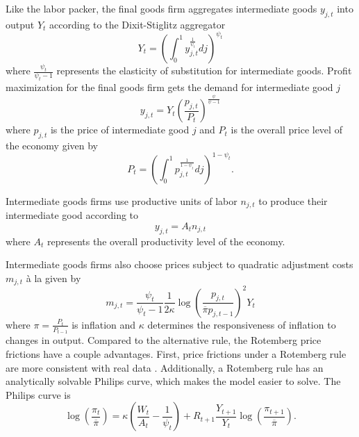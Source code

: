 Like the labor packer, the final goods firm aggregates intermediate goods $y_{j, t}$ into output $Y_t$ according to the Dixit-Stiglitz aggregator
\begin{equation*}
    Y_t = \left( \int_0^1 y_{j, t}^\frac{1}{\psi_t} dj \right)^{\psi_t}
\end{equation*}
where $\frac{\psi_t}{\psi_t - 1}$ represents the elasticity of substitution for intermediate goods. Profit maximization for the final goods firm gets the demand for intermediate good $j$
\begin{equation*}
    y_{j, t} = Y_t \left(\frac{p_{j, t}}{P_t}\right)^\frac{\psi}{\psi - 1}
\end{equation*}
where $p_{j, t}$ is the price of intermediate good $j$ and $P_t$ is the overall price level of the economy given by
\begin{equation*}
    P_t = \left(\int_0^1 p_{j, t}^\frac{1}{1 - \psi_t} dj \right)^{1 - \psi_t}.
\end{equation*}

Intermediate goods firms use productive units of labor $n_{j, t}$ to produce their intermediate good according to
\begin{equation*}
    y_{j, t} = A_t n_{j, t}
\end{equation*}
where $A_t$ represents the overall productivity level of the economy.

Intermediate goods firms also choose prices subject to quadratic adjustment costs $m_{j, t}$ à la \textcite{rotemberg1982sticky} given by
\begin{equation*}
    m_{j, t} = \frac{\psi_t}{\psi_t - 1} \frac{1}{2 \kappa} \log\left(\frac{p_{j, t}}{\overline{\pi} p_{j, t - 1}}\right)^2 Y_t
\end{equation*}
where $\pi = \frac{P_t}{P_{t - 1}}$ is inflation and $\kappa$ determines the responsiveness of inflation to changes in output. Compared to the alternative \textcite{calvo1983staggered} rule, the Rotemberg price frictions have a couple advantages. First, price frictions under a Rotemberg rule are more consistent with real data \autocite{richter2016rotemberg}. Additionally, a Rotemberg rule has an analytically solvable Philips curve, which makes the model easier to solve. The Philips curve is
\begin{equation*}
    \log \left(\frac{\pi_t}{\overline{\pi}}\right) = \kappa \left(\frac{W_t}{A_t} - \frac{1}{\psi_t}\right) + R_{t+1} \frac{Y_{t+1}}{Y_t} \log\left(\frac{\pi_{t+1}}{\overline{\pi}}\right).
\end{equation*}


